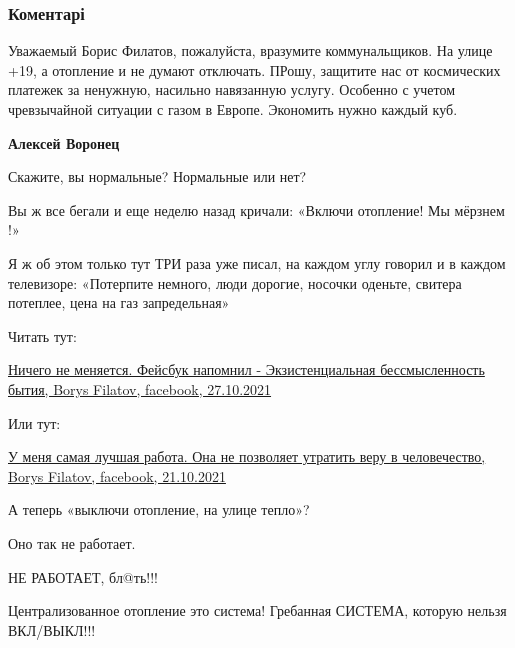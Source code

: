  
 
 
 
 
\subsubsection{Коментарі}
\label{sec:04_11_2021.fb.filatov_boris.1.post_pro_sobak.cmt}

\begin{itemize} %

Уважаемый Борис Филатов, пожалуйста, вразумите коммунальщиков. На улице +19, а
отопление и не думают отключать. ПРошу, защитите нас от космических платежек за
ненужную, насильно навязанную услугу. Особенно с учетом чревзычайной ситуации с
газом в Европе. Экономить нужно каждый куб.

\begin{itemize} %
\textbf{Алексей Воронец} 

Скажите, вы нормальные? Нормальные или нет?

Вы ж все бегали и еще неделю назад кричали: «Включи отопление! Мы мёрзнем !»

Я ж об этом только тут ТРИ раза уже писал, на каждом углу говорил и в каждом
телевизоре: «Потерпите немного, люди дорогие, носочки оденьте, свитера
потеплее, цена на газ запредельная»

Читать тут: 

\href{https://www.facebook.com/100002157183088/posts/4479461452135717/?d=n}{%
Ничего не меняется. Фейсбук напомнил - Экзистенциальная бессмысленность бытия, Borys Filatov, facebook, %
27.10.2021%
}

Или тут: 

\href{https://www.facebook.com/100002157183088/posts/4459358090812720/?d=n}{%
У меня самая лучшая работа. Она не позволяет утратить веру в человечество, %
Borys Filatov, facebook, %
21.10.2021%
}

А теперь «выключи отопление, на улице тепло»?

Оно так не работает.

НЕ РАБОТАЕТ, бл@ть!!!

Централизованное отопление это система! Гребанная СИСТЕМА, которую нельзя
ВКЛ/ВЫКЛ!!!


\end{itemize}
\end{itemize}

